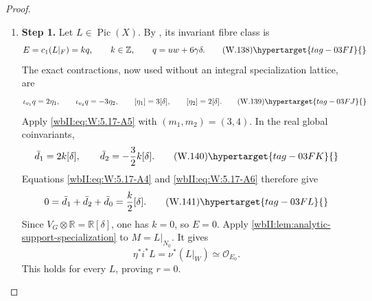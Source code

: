 \begin{proof}
\begin{enumerate}[label={$\langle1\rangle$\arabic*.},leftmargin=*]
\item 
\noindent\textbf{Step 1.} Let \(L\in\operatorname{Pic}(X)\).  By
, its invariant fibre class is
\[
 E=c_1(L|_F)=kq,
 \qquad k\in\mathbb Z,
 \qquad q=uw+6\gamma\delta.
\tag{W.138}\hypertarget{tag-03FI}{}\label{wbII:eq:W:5.17-A35}
\]
The exact contractions, now used without an integral specialization
lattice, are
\[
 \iota_{v_1}q=2\eta_1,
 \qquad
 \iota_{v_2}q=-3\eta_2,
 \qquad
 [\eta_1]=3[\delta],
 \qquad
 [\eta_2]=2[\delta].
\tag{W.139}\hypertarget{tag-03FJ}{}\label{wbII:eq:W:5.17-A36}
\]
Apply \eqref{wbII:eq:W:5.17-A5} with \((m_1,m_2)=(3,4)\).  In the real global
coinvariants,
\[
 \bar d_1=2k[\delta],
 \qquad
 \bar d_2=-\frac32k[\delta].
\tag{W.140}\hypertarget{tag-03FK}{}\label{wbII:eq:W:5.17-A37}
\]
Equations \eqref{wbII:eq:W:5.17-A4} and \eqref{wbII:eq:W:5.17-A6} therefore give
\[
 0=\bar d_1+\bar d_2+\bar d_0
   =\frac{k}{2}[\delta].
\tag{W.141}\hypertarget{tag-03FL}{}\label{wbII:eq:W:5.17-A38}
\]
Since \(V_G\otimes\mathbb R=\mathbb R[\delta]\), one has \(k=0\), so
\(E=0\).  Apply \cref{wbII:lem:analytic-support-specialization} to
\(M=L|_{N_0}\).  It gives
\[
 \eta^*i^*L=\nu^*(L|_W)\simeq\mathcal O_{E_0}.
\]
This holds for every \(L\), proving \(r=0\).

\end{enumerate}
\end{proof}
